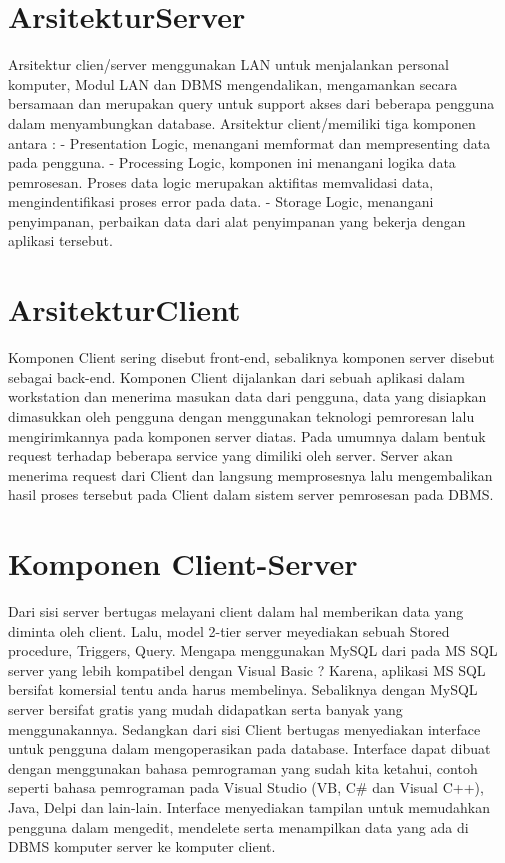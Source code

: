 {\section{ArsitekturServer}
Arsitektur clien/server menggunakan LAN untuk menjalankan personal komputer, Modul LAN dan DBMS mengendalikan, mengamankan secara bersamaan dan merupakan query untuk support akses dari beberapa pengguna dalam menyambungkan database.
Arsitektur client/memiliki tiga komponen antara :
- Presentation Logic, menangani memformat dan mempresenting data pada pengguna.
- Processing Logic, komponen ini menangani logika data pemrosesan. Proses data logic merupakan aktifitas memvalidasi data, mengindentifikasi proses error pada data.
- Storage Logic, menangani penyimpanan, perbaikan data dari alat penyimpanan yang bekerja dengan aplikasi tersebut.

\section{ArsitekturClient}
Komponen Client sering disebut front-end, sebaliknya komponen server disebut sebagai back-end. 
Komponen Client dijalankan dari sebuah aplikasi dalam workstation dan menerima masukan data dari pengguna, data yang disiapkan dimasukkan oleh pengguna dengan menggunakan teknologi pemroresan lalu mengirimkannya pada komponen server diatas. 
Pada umumnya dalam bentuk request terhadap beberapa service yang dimiliki oleh server. 
Server akan menerima request dari Client dan langsung memprosesnya lalu mengembalikan hasil proses tersebut pada Client dalam sistem server pemrosesan pada DBMS.

\section{Komponen Client-Server}
Dari sisi server bertugas melayani client dalam hal memberikan data yang diminta oleh client.
Lalu, model 2-tier server meyediakan sebuah Stored procedure, Triggers, Query. 
Mengapa menggunakan MySQL dari pada MS SQL server yang lebih kompatibel dengan Visual Basic ? Karena, aplikasi MS SQL bersifat komersial tentu anda harus membelinya. 
Sebaliknya dengan MySQL server bersifat gratis yang mudah didapatkan serta banyak yang menggunakannya. Sedangkan dari sisi Client bertugas menyediakan interface untuk pengguna dalam mengoperasikan pada database. 
Interface dapat dibuat dengan menggunakan bahasa pemrograman yang sudah kita ketahui, contoh seperti bahasa pemrograman pada Visual Studio (VB, C# dan Visual C++), Java, Delpi dan lain-lain. 
Interface menyediakan tampilan untuk memudahkan pengguna dalam mengedit, mendelete serta menampilkan data yang ada di DBMS komputer server ke komputer client.

}
